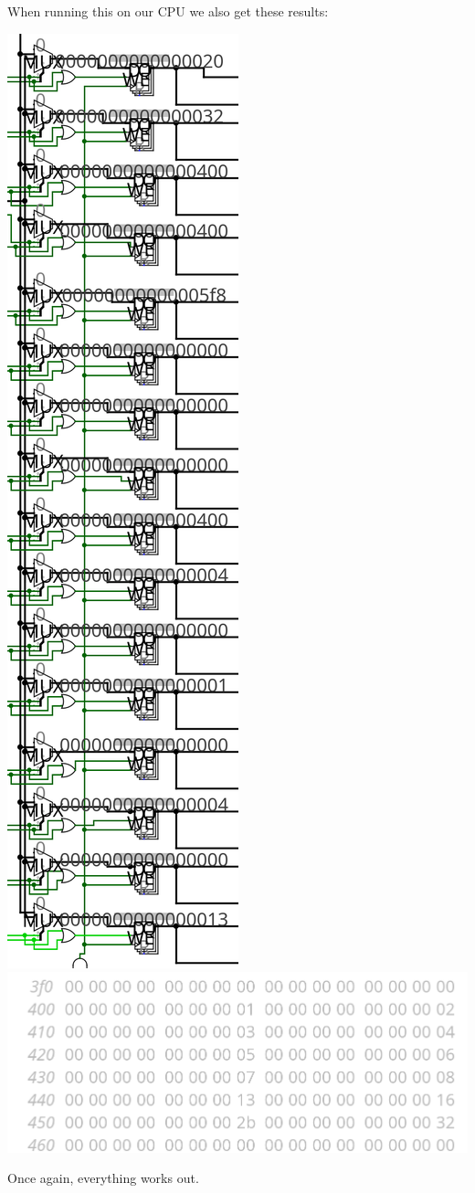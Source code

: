 \documentclass{article}
\begin{document}
When running this on our CPU we also get these results:
\begin{center}
    \includegraphics[scale=.5]{matrixReg.png} 
    \includegraphics[scale=.6]{matrixMem.png} 
\end{center}
Once again, everything works out.
\end{document}
